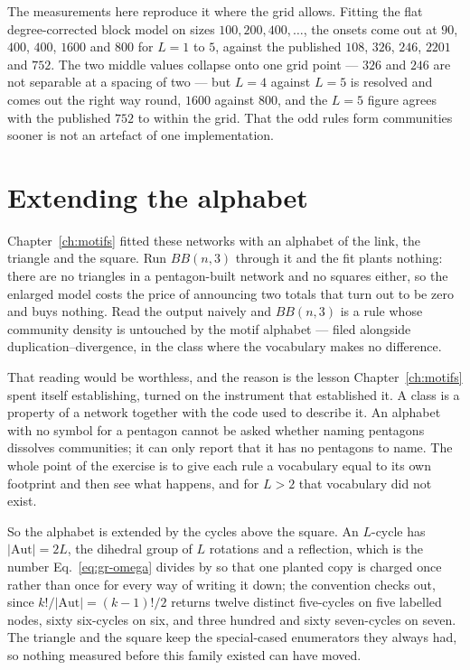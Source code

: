 The measurements here reproduce it where the grid allows. Fitting the flat
degree-corrected block model on sizes $100,200,400,\ldots$, the onsets come out
at $90$, $400$, $400$, $1600$ and $800$ for $L=1$ to $5$, against the published
$108$, $326$, $246$, $2201$ and $752$. The two middle values collapse onto one
grid point --- $326$ and $246$ are not separable at a spacing of two --- but
$L=4$ against $L=5$ is resolved and comes out the right way round, $1600$ against
$800$, and the $L=5$ figure agrees with the published $752$ to within the grid.
That the odd rules form communities sooner is not an artefact of one
implementation.

\section{Extending the alphabet}
\label{sec:bb-alphabet}

Chapter~\ref{ch:motifs} fitted these networks with an alphabet of the link, the
triangle and the square. Run $BB(n,3)$ through it and the fit plants nothing:
there are no triangles in a pentagon-built network and no squares either, so the
enlarged model costs the price of announcing two totals that turn out to be zero
and buys nothing. Read the output naively and $BB(n,3)$ is a rule whose community
density is untouched by the motif alphabet --- filed alongside
duplication--divergence, in the class where the vocabulary makes no difference.

That reading would be worthless, and the reason is the lesson
Chapter~\ref{ch:motifs} spent itself establishing, turned on the instrument that
established it. A class is a property of a network together with the code used to
describe it. An alphabet with no symbol for a pentagon cannot be asked whether
naming pentagons dissolves communities; it can only report that it has no
pentagons to name. The whole point of the exercise is to give each rule a
vocabulary equal to its own footprint and then see what happens, and for $L>2$
that vocabulary did not exist.

So the alphabet is extended by the cycles above the square. An $L$-cycle has
$|\mathrm{Aut}|=2L$, the dihedral group of $L$ rotations and a reflection, which
is the number Eq.~\eqref{eq:gr-omega} divides by so that one planted copy is
charged once rather than once for every way of writing it down; the convention
checks out, since $k!/|\mathrm{Aut}|=(k-1)!/2$ returns twelve distinct
five-cycles on five labelled nodes, sixty six-cycles on six, and three hundred
and sixty seven-cycles on seven. The triangle and the square keep the
special-cased enumerators they always had, so nothing measured before this family
existed can have moved.

